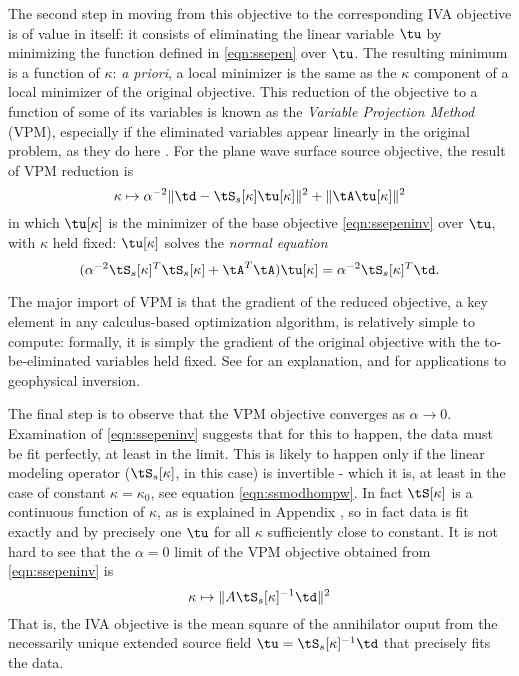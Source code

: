 The second step in moving from this objective to the corresponding IVA
objective is of value in itself: it consists of eliminating the linear
variable $\tu$ by minimizing the function defined in \ref{eqn:ssepen}
over $\tu$. The resulting minimum is a function of $\kappa$: {\em a
  priori}, a local minimizer is the same as the $\kappa$ component of
a local minimizer of the original objective. This reduction of the
objective to a function of some of its variables is known as the {\em
  Variable Projection Method} (VPM), especially if the eliminated variables
appear linearly in the original problem, as they do here
\cite[]{GolubPereyra:03}. For the plane wave surface source objective,
the result of VPM reduction is
\begin{equation}
  \label{eqn:ssevpm}
  \kappa \mapsto \alpha^{-2}\|\td-\tS_s[\kappa]\tu[\kappa]\|^2 + \|\tA\tu[\kappa]\|^2
\end{equation}
in which $\tu[\kappa]$ is the minimizer of the base objective
\ref{eqn:ssepeninv} over $\tu$, with $\kappa$ held fixed:
$\tu[\kappa]$ solves the {\em normal equation}
\begin{equation}
  \label{eqn:ssenorm}
  (\alpha^{-2}\tS_s[\kappa]^T\tS_s[\kappa] +
  \tA^T\tA)\tu[\kappa]=\alpha^{-2}\tS_s[\kappa]^T\td.
\end{equation}

The major import of VPM is that the gradient
of the reduced objective, a key element in any calculus-based
optimization algorithm, is relatively simple to compute: formally, it
is simply the gradient of the original objective with the
to-be-eliminated variables held fixed. See \cite{GolubPereyra:03} for
an explanation, and
\cite{vanLeeuwenMulder:09,Rickett:SEG12,LiRickettAbubakar:13} for
applications to geophysical inversion.

The final step is to observe that the VPM objective converges as
$\alpha \rightarrow 0$. Examination of \ref{eqn:ssepeninv} suggests
that for this to happen, the data must be fit perfectly, at least in
the limit. This is likely to happen only if the linear modeling
operator ($\tS_s[\kappa]$, in this case) is invertible - which it is,
at least in the case of constant $\kappa=\kappa_0$,
see equation \ref{eqn:ssmodhompw}.  In fact $\tS[\kappa]$ is a
continuous function of $\kappa$, as is explained in Appendix \appSingular, so in fact data is fit exactly and by precisely one $\tu$ for
all $\kappa$ sufficiently close to constant. It is not hard to see that the
$\alpha = 0$ limit of the VPM objective obtained from 
\ref{eqn:ssepeninv} is
\begin{equation}
  \label{eqn:ssiva}
  \kappa \mapsto \|A \tS_s[\kappa]^{-1}\td\|^2
\end{equation}
That is, the IVA objective is the mean square of the annihilator ouput
from the necessarily unique extended source field $\tu =
\tS_s[\kappa]^{-1}\td$ that precisely fits the data.

